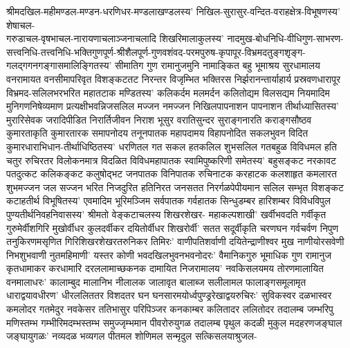 
\begin{flushleft}
श्रीमदखिल-महीमण्डल-मण्डन-धरणिधर-मण्डलाखण्डलस्य'
निखिल-सुरासुर-वन्दित-वराहक्षेत्र-विभूषणस्य' शेषाचल-\\गरुडाचल-वृषभाचल-नारायणाचलाञ्जनाचलादि शिखरिमालाकुलस्य' नादमुख-बोधनिधि-वीधिगुण-साभरण-सत्त्वनिधि-तत्त्वनिधि-भक्तिगुणपूर्ण-श्रीशैलपूर्ण-गुणवशंवद-परमपुरुष-कृपापूर-विभ्रमदतुङ्गशृङ्ग-गलद्गगनगङ्गासमालिङ्गितस्य' सीमातिग गुण रामानुजमुनि नामाङ्कित बहु भूमाश्रय सुरधामालय
वनरामायत वनसीमापरिवृत विशङ्कटतट निरन्तर विजृम्भित भक्तिरस 
निर्झरानन्तार्याहार्य प्रस्रवणधारापूर विभ्रमद-सलिल\-भरभरित महातटाक मण्डितस्य' कलिकर्दम मलमर्दन कलितोद्यम विलसद्यम
नियमादिम मुनिगणनिषेव्यमाण प्रत्यक्षीभवन्निजसलिल मज्जन
नमज्जन निखिलपापनाशन पापनाशन तीर्थाध्यासितस्य'
मुरारिसेवक जरादिपीडित निरार्तिजीवन निराश भूसुर वरातिसुन्दर सुराङ्गनारति कराङ्गसौष्ठव कुमारताकृति कुमारतारक समापनोदय तनूनपातक महापदामय विहापनोदित सकलभुवन विदित कुमारधाराभिधान-तीर्थाधिष्ठितस्य' धरणितल गत सकल हतकलिल शुभसलिल गतबहुळ विविधमल हति चतुर रुचिरतर विलोकनमात्र विदळित विविधमहापातक स्वामिपुष्करिणी समेतस्य' बहुसङ्कट
नरकावट पतदुत्कट कलिकङ्कट कलुषोद्भट जनपातक विनिपातक
रुचिनाटक करहाटक कलशाहृत कमलारत शुभमज्जन जल सज्जन भरित निजदुरित हतिनिरत जनसतत निरर्गळपेपीयमान सलिल
सम्भृत विशङ्कट कटाहतीर्थ विभूषितस्य' एवमादिम भूरिमञ्जिम
सर्वपातक गर्वहातक सिन्धुडम्बर हारिशम्बर विविधविपुल पुण्यतीर्थनिवहनिवासस्य' श्रीमतो वेङ्कटाचलस्य शिखरशेखर-%
महाकल्पशाखी' खर्वीभवदति गर्वीकृत गुरुमेर्वीशगिरि मुखोर्वीधर कुलदर्वीकर दयितोर्वीधर शिखरोर्वी' सतत सदूर्वीकृति चरणघन गर्वचर्वण निपुण तनुकिरणमसृणित गिरिशिखरशेखरतरुनिकर
तिमिरः' वाणीपतिशर्वाणी दयितेन्द्राणीश्वर मुख नाणीयोरसवेणी निभशुभवाणी नुतमहिमाणी' यस्तर कोणी भवदखिलभुवनभवनोदरः' वैमानिकगुरु भूमाधिक गुण रामानुज कृतधामाकर करधामारि दरललामाच्छकनक दामायित निजरामालय' नवकिसलयमय तोरणमालायित वनमालाधरः' कालाम्बुद मालानिभ नीलालक
जालावृत बालाब्ज सलीलामल फालाङ्गसमूलामृत धाराद्वयावधीरण' धीरललिततर विशदतर घन घनसारमयोर्ध्वपुण्ड्ररेखाद्वयरुचिरः' सुविकस्वर दळभास्वर कमलोदर गतमेदुर नवकेसर ततिभासुर परिपिञ्जर कनकाम्बर कलितादर ललितोदर तदालम्ब जम्भरिपु मणिस्तम्भ गम्भीरिमदम्भस्तम्भ समुज्जृम्भमान पीवरोरुयुगळ
तदालम्ब पृथुल कदळी मुकुल मदहरणजङ्घाल जङ्घायुगळः'
नव्यदळ भव्यगल पीतमल शोणिमल सन्मृदुल सत्किसलयाश्रुजल-%

\end{flushleft}

